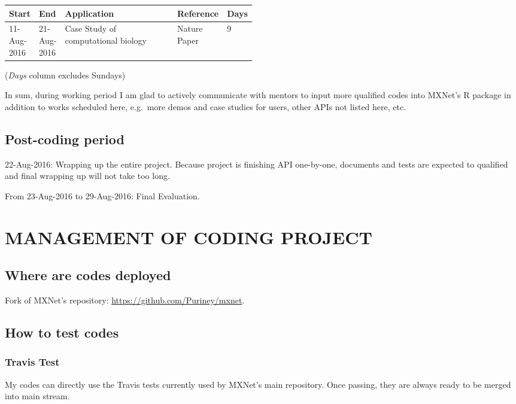 \documentclass[]{article}
\begin{document}
\begin{longtable}[c]{@{}llp{0.48\linewidth}ll@{}}
\toprule
Start & End & Application & Reference & Days\tabularnewline
\midrule
\endhead
11-Aug-2016 & 21-Aug-2016 & Case Study of computational biology & Nature
Paper & 9\tabularnewline
\bottomrule
\end{longtable}

(\emph{Days} column excludes Sundays)

In sum, during working period I am glad to actively communicate with
mentors to input more qualified codes into MXNet's R package in addition
to works scheduled here, e.g.~more demos and case studies for users,
other APIs not listed here, etc.

\subsection{Post-coding period}\label{post-coding-period}

22-Aug-2016: Wrapping up the entire project. Because project is
finishing API one-by-one, documents and tests are expected to qualified
and final wrapping up will not take too long.

From 23-Aug-2016 to 29-Aug-2016: Final Evaluation.

\section{MANAGEMENT OF CODING
PROJECT}\label{management-of-coding-project}

\subsection{Where are codes deployed}\label{where-are-codes-deployed}

Fork of MXNet's repository: \url{https://github.com/Puriney/mxnet}.

\subsection{How to test codes}\label{how-to-test-codes}

\subsubsection{Travis Test}\label{travis-test}

My codes can directly use the Travis tests currently used by MXNet's
main repository. Once passing, they are always ready to be merged into
main stream.
\end{document}
